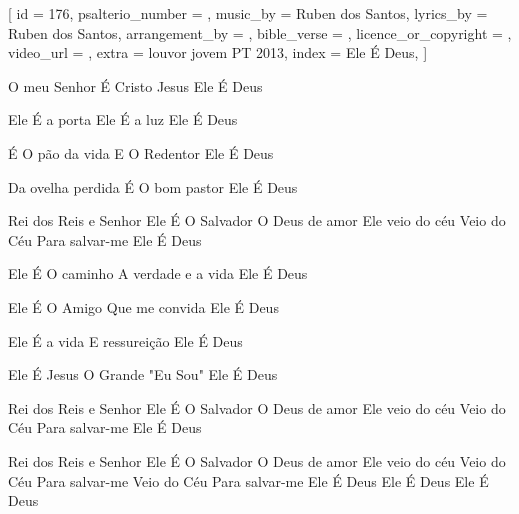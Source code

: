 [
    id                     = {176},
    psalterio_number       = {},
    music_by               = {Ruben dos Santos},
    lyrics_by              = {Ruben dos Santos},
    arrangement_by         = {},
    bible_verse            = {},
    licence_or_copyright   = {},
    video_url              = {},
    extra                  = {louvor jovem PT 2013},
    index                  = {Ele É Deus},
]

\beginverse
O meu Senhor 
É Cristo Jesus
Ele É Deus

Ele É a porta
Ele É a luz
Ele É Deus

É O pão da vida
E O Redentor
Ele É Deus

Da ovelha perdida 
É O bom pastor
Ele É Deus
\endverse

\beginchorus
Rei dos Reis e Senhor 
Ele É O Salvador 
O Deus de amor 
Ele veio do céu 
Veio do Céu
Para salvar-me 
Ele É Deus
\endchorus

\beginverse
Ele É O caminho 
A verdade e a vida
Ele É Deus

Ele É O Amigo
Que me convida
Ele É Deus

Ele É a vida
E ressureição
Ele É Deus

Ele É Jesus
O Grande "Eu Sou"
Ele É Deus
\endverse

\beginchorus
Rei dos Reis e Senhor 
Ele É O Salvador 
O Deus de amor 
Ele veio do céu 
Veio do Céu
Para salvar-me 
Ele É Deus
\endchorus


\beginchorus
Rei dos Reis e Senhor 
Ele É O Salvador 
O Deus de amor 
Ele veio do céu 
Veio do Céu
Para salvar-me 
Veio do Céu
Para salvar-me 
Ele É Deus
Ele É Deus
Ele É Deus
\endchorus

\endsong
